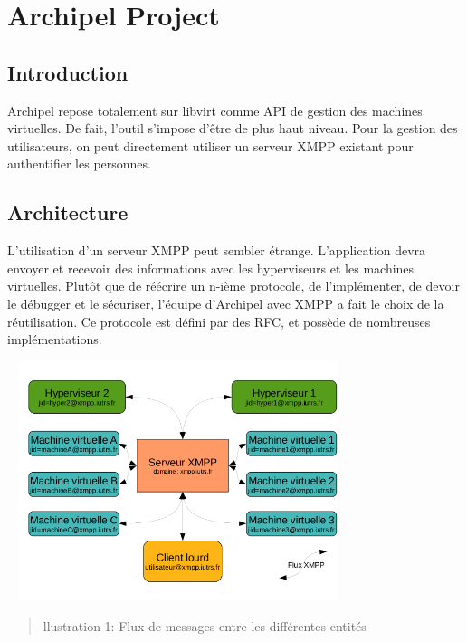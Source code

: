   \chapter{Archipel Project}
    \section{Introduction}
Archipel repose totalement sur libvirt comme API de gestion des machines virtuelles. De fait, l'outil
s'impose d'être de plus haut niveau. Pour la gestion des utilisateurs, on peut directement utiliser un
serveur XMPP existant pour authentifier les personnes.

    \section{Architecture}
L'utilisation d'un serveur XMPP peut sembler étrange. L'application devra envoyer et recevoir des
informations avec les hyperviseurs et les machines virtuelles. Plutôt que de réécrire un n-ième protocole,
de l'implémenter, de devoir le débugger et le sécuriser, l'équipe d'Archipel avec XMPP a fait le choix de la
réutilisation. Ce protocole est défini par des RFC, et possède de nombreuses implémentations.
\begin{center}
\includegraphics[width=10cm,height=7cm]{images/archi_archipel.png}
\begin{quote}llustration 1: Flux de messages entre les différentes entités\end{quote}
\end{center}

